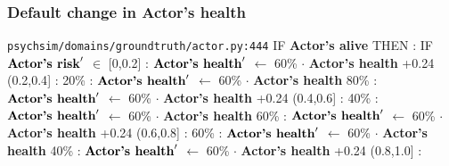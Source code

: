 \documentclass{article}%
\begin{document}
\subsubsection{Default change in Actor's health}%
\label{ssubsec:Default change in Actor's health}%
\begin{flushleft}%
\verb|psychsim/domains/groundtruth/actor.py:444|%
\linebreak%
IF %
\textbf{Actor's alive}%
\linebreak%
\hspace*{2em}%
THEN %
: %
IF %
$\mbox{\textbf{Actor's risk}} '$%
$\in$%
\linebreak%
\hspace*{4em}%
{[}0,0.2{]}%
: %
$\mbox{\textbf{Actor's health}} '$%
$\leftarrow$%
60\%%
$\cdot$%
\textbf{Actor's health}%
+0.24%
\linebreak%
\hspace*{4em}%
(0.2,0.4{]}%
: %
\linebreak%
\hspace*{6em}%
20\%%
: %
$\mbox{\textbf{Actor's health}} '$%
$\leftarrow$%
60\%%
$\cdot$%
\textbf{Actor's health}%
\linebreak%
\hspace*{6em}%
80\%%
: %
$\mbox{\textbf{Actor's health}} '$%
$\leftarrow$%
60\%%
$\cdot$%
\textbf{Actor's health}%
+0.24%
\linebreak%
\hspace*{4em}%
(0.4,0.6{]}%
: %
\linebreak%
\hspace*{6em}%
40\%%
: %
$\mbox{\textbf{Actor's health}} '$%
$\leftarrow$%
60\%%
$\cdot$%
\textbf{Actor's health}%
\linebreak%
\hspace*{6em}%
60\%%
: %
$\mbox{\textbf{Actor's health}} '$%
$\leftarrow$%
60\%%
$\cdot$%
\textbf{Actor's health}%
+0.24%
\linebreak%
\hspace*{4em}%
(0.6,0.8{]}%
: %
\linebreak%
\hspace*{6em}%
60\%%
: %
$\mbox{\textbf{Actor's health}} '$%
$\leftarrow$%
60\%%
$\cdot$%
\textbf{Actor's health}%
\linebreak%
\hspace*{6em}%
40\%%
: %
$\mbox{\textbf{Actor's health}} '$%
$\leftarrow$%
60\%%
$\cdot$%
\textbf{Actor's health}%
+0.24%
\linebreak%
\hspace*{4em}%
(0.8,1.0{]}%
: %
\linebreak%

\end{flushleft}
\end{document}
